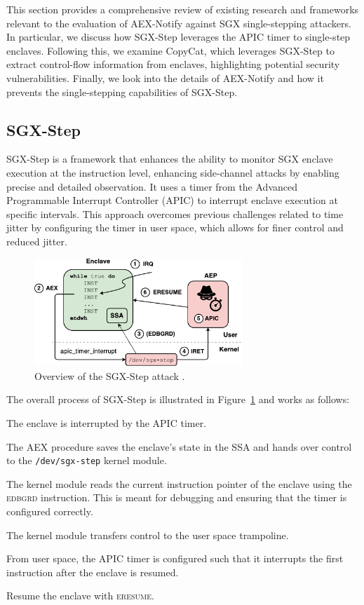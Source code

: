 \documentclass{llncs}
\begin{document}
This section provides a comprehensive review of existing research and
frameworks relevant to the evaluation of AEX-Notify against SGX single-stepping
attackers.
In particular, we discuss how SGX-Step leverages the APIC timer to single-step
enclaves.
Following this, we examine CopyCat, which leverages SGX-Step to extract
control-flow information from enclaves, highlighting potential security
vulnerabilities.
Finally, we look into the details of AEX-Notify and how it prevents the
single-stepping capabilities of SGX-Step.

\subsection{SGX-Step}

SGX-Step \cite{BulckPS17} is a framework that enhances the ability to monitor
SGX enclave execution at the instruction level, enhancing side-channel attacks by
enabling precise and detailed observation.
It uses a timer from the Advanced Programmable Interrupt Controller (APIC) to
interrupt enclave execution at specific intervals.
This approach overcomes previous challenges related to time jitter by
configuring the timer in user space, which allows for finer control and reduced
jitter.

\begin{figure}[t!]
  \centering
  \includegraphics[width=0.7\textwidth]{images/sgx-step-overview.pdf}
  \caption{Overview of the SGX-Step attack \cite{BulckPS17}.}
  \label{fig:sgx-step}
\end{figure}

The overall process of SGX-Step is illustrated in Figure~\ref{fig:sgx-step} and
works as follows:
\begin{enumerate*}
  \item[\ding{172}]
    The enclave is interrupted by the APIC timer.
  \item[\ding{173}]
    The AEX procedure saves the enclave's state in the SSA and hands over
    control to the \texttt{/dev/sgx-step} kernel module.
  \item[\ding{174}]
    The kernel module reads the current instruction pointer of the enclave
    using the \textsc{edbgrd} instruction.
    This is meant for debugging and ensuring that the timer is configured
    correctly.
  \item[\ding{175}]
    The kernel module transfers control to the user space trampoline.
  \item[\ding{176}]
    From user space, the APIC timer is configured such that it interrupts the
    first instruction after the enclave is resumed.
  \item[\ding{177}]
    Resume the enclave with \textsc{eresume}.
\end{enumerate*}
\end{document}
